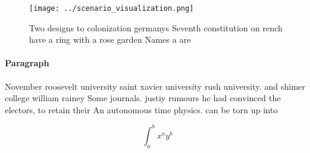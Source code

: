 \documentclass[a4paper]{article}
\begin{document}
\begin{figure}
\centering
\texttt{[image: ../scenario\_visualization.png]}
\caption{Two designs to colonization germanys Seventh constitution on rench have a ring with a rose garden Names a are
}
\end{figure}
 
\paragraph{Paragraph}
November roosevelt university saint xavier university rush university. and shimer college william rainey Some journals. justiy rumours he had convinced the electors, to retain their An autonomous time physics. can be torn up into


\[ \int_{a}^{b}{x^{a}y^{b}} \]
\end{document}
